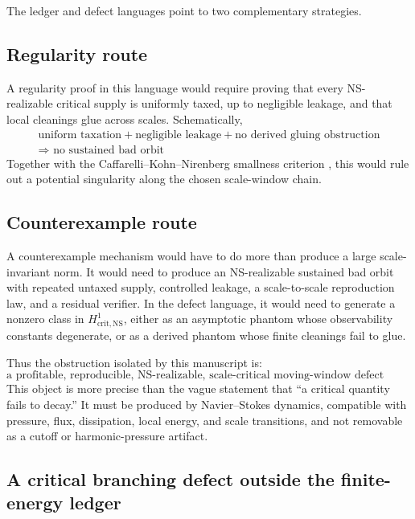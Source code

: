 \documentclass[11pt]{article}
\numberwithin{equation}{section}
\newcommand{\NS}{\mathrm{NS}}
\newcommand{\crit}{\mathrm{crit}}
\begin{document}
The ledger and defect languages point to two complementary strategies.

\subsection*{Regularity route}

A regularity proof in this language would require proving that every NS-realizable critical supply is uniformly taxed, up to negligible leakage, and that local cleanings glue across scales.  Schematically,
\[
\boxed{
\begin{gathered}
\text{uniform taxation}+\text{negligible leakage}+\text{no derived gluing obstruction}\\
\Longrightarrow\text{ no sustained bad orbit}
\end{gathered}}
\]
Together with the Caffarelli--Kohn--Nirenberg smallness criterion \cite{CKN1982,Lin1998,SereginLectureNotes}, this would rule out a potential singularity along the chosen scale-window chain.

\subsection*{Counterexample route}

A counterexample mechanism would have to do more than produce a large scale-invariant norm.  It would need to produce an NS-realizable sustained bad orbit with repeated untaxed supply, controlled leakage, a scale-to-scale reproduction law, and a residual verifier.  In the defect language, it would need to generate a nonzero class in $H^1_{\crit,\NS}$, either as an asymptotic phantom whose observability constants degenerate, or as a derived phantom whose finite cleanings fail to glue.

Thus the obstruction isolated by this manuscript is:
\[
\boxed{
\text{a profitable, reproducible, NS-realizable, scale-critical moving-window defect cascade.}
}
\]
This object is more precise than the vague statement that ``a critical quantity fails to decay.''  It must be produced by Navier--Stokes dynamics, compatible with pressure, flux, dissipation, local energy, and scale transitions, and not removable as a cutoff or harmonic-pressure artifact.


\subsection*{A critical branching defect outside the finite-energy ledger}
\end{document}
